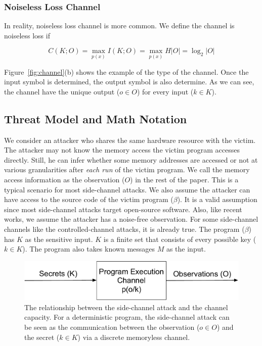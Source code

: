 \subsubsection{Noiseless Loss Channel}
In reality, noiseless loss channel is more common. We define the channel is noiseless loss if

\begin{equation} \label{chapter:eq:5}
  C(K;O) = \max_{p(x)} I(K;O) = \max_{p(x)} H |O| = \log_2 {|O|}
\end{equation}

Figure~\ref{fig:channel}(b) shows the example of the type of the channel. Once the input symbol is determined, the output symbol is also determine. As we can see, the channel have the unique output ($o \in O$) for every input ($k \in K$).


\subsection{Threat Model and Math Notation}


We consider an attacker who shares the same hardware resource with the victim. The attacker may not know the memory access the victim program accesses directly. Still, he can infer whether some memory addresses are accessed or not at various granularities after \textit{each run} of the victim program. We call the memory access information as the observation ($O$) in the rest of the paper. This is a typical scenario for most side-channel attacks.  We also assume the attacker can have access to the source code of the victim program ($\beta$). It is a valid assumption since most side-channel attacks target open-source software. Also, like recent works, we assume the attacker has a noise-free observation. For some side-channel channels like the controlled-channel attacks, it is already true. The program ($\beta$) has $K$ as the sensitive input. $K$ is a finite set that consists of every possible key ($k \in K$). The program also takes known messages $M$ as the input.

\begin{figure}[ht]
  \centering
  \includegraphics[width=.8\columnwidth]{./figures/chapter5/channel.pdf}
  \caption{The relationship between the side-channel attack and the channel capacity. For a deterministic program, the side-channel attack can be seen as the communication between the observation ($o \in O$) and the secret ($k \in K$) via a discrete memoryless channel.}
  \label{fig:side_channel}
\end{figure}

